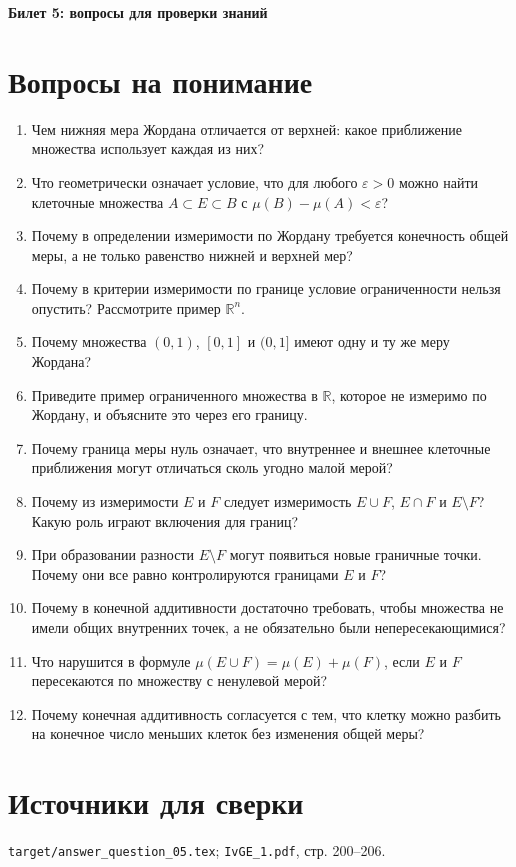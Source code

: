 \documentclass[12pt,a4paper]{article}
\begin{document}
\begin{center}
{\Large\bfseries Билет 5: вопросы для проверки знаний}
\end{center}

\noindent{}

\section*{Вопросы на понимание}

\begin{enumerate}
\item Чем нижняя мера Жордана отличается от верхней: какое приближение множества использует каждая из них?
\item Что геометрически означает условие, что для любого $\varepsilon>0$ можно найти клеточные множества $A\subset E\subset B$ с $\mu(B)-\mu(A)<\varepsilon$?
\item Почему в определении измеримости по Жордану требуется конечность общей меры, а не только равенство нижней и верхней мер?
\item Почему в критерии измеримости по границе условие ограниченности нельзя опустить? Рассмотрите пример $\mathbb{R}^n$.
\item Почему множества $(0,1)$, $[0,1]$ и $(0,1]$ имеют одну и ту же меру Жордана?
\item Приведите пример ограниченного множества в $\mathbb{R}$, которое не измеримо по Жордану, и объясните это через его границу.
\item Почему граница меры нуль означает, что внутреннее и внешнее клеточные приближения могут отличаться сколь угодно малой мерой?
\item Почему из измеримости $E$ и $F$ следует измеримость $E\cup F$, $E\cap F$ и $E\setminus F$? Какую роль играют включения для границ?
\item При образовании разности $E\setminus F$ могут появиться новые граничные точки. Почему они все равно контролируются границами $E$ и $F$?
\item Почему в конечной аддитивности достаточно требовать, чтобы множества не имели общих внутренних точек, а не обязательно были непересекающимися?
\item Что нарушится в формуле $\mu(E\cup F)=\mu(E)+\mu(F)$, если $E$ и $F$ пересекаются по множеству с ненулевой мерой?
\item Почему конечная аддитивность согласуется с тем, что клетку можно разбить на конечное число меньших клеток без изменения общей меры?
\end{enumerate}

\section*{Источники для сверки}

\texttt{target/answer\_question\_05.tex};
\texttt{IvGE\_1.pdf}, стр. 200--206.
\end{document}
